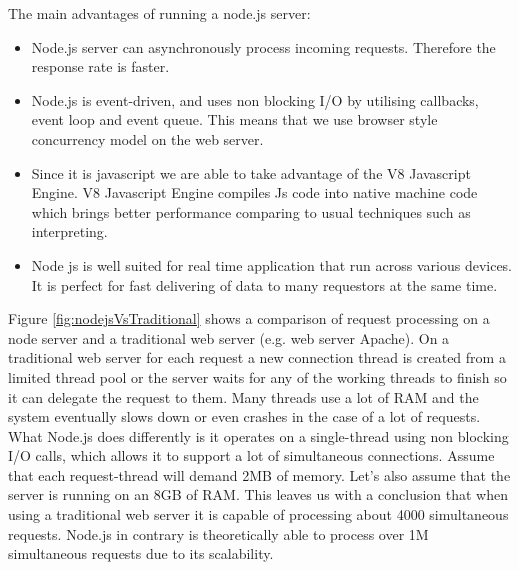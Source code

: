 \documentclass[thesis=M,english]{FITthesis}[2012/10/20]
\begin{document}
The main advantages of running a node.js server:

\begin{itemize}
\item{} Node.js server can asynchronously process incoming requests. Therefore the response rate is faster. 

\item{} Node.js is event-driven, and uses non blocking I/O by utilising callbacks, event loop and event queue. This means that we use browser style concurrency model on the web server.

\item{} Since it is javascript we are able to take advantage of the V8 Javascript Engine. V8 Javascript Engine compiles Js code into native machine code which brings better performance comparing to usual techniques such as interpreting.

\item{} Node js is well suited for real time application that run across various devices. It is perfect for fast delivering of data to many requestors at the same time.
\end{itemize}



Figure \ref{fig:nodejsVsTraditional} shows a comparison of request processing on a node server and a traditional web server (e.g. web server Apache). On a traditional web server for each request a new connection thread is created from a limited thread pool or the server waits for any of the working threads to finish so it can delegate the request to them. Many threads use a lot of RAM and the system eventually slows down or even crashes in the case of a lot of requests.
What Node.js does differently is it operates on a single-thread using non blocking I/O calls, which allows it to support a lot of simultaneous connections.
Assume that each request-thread will demand 2MB of memory. Let's also assume that the server is running on an 8GB of RAM. This leaves us with a conclusion that when using a traditional web server it is capable of processing about 4000 simultaneous requests. Node.js in contrary is theoretically able to process over 1M simultaneous requests due to its scalability. \cite{why-node}
\end{document}
